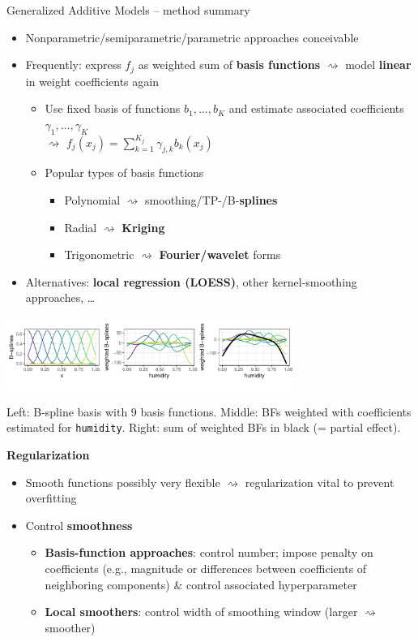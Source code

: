 \documentclass[11pt,compress,t,notes=noshow, xcolor=table]{beamer}
\newcommand{\highlight}[1]{\textcolor{hlcol}{\textbf{#1}}}
\begin{document}
\begin{vbframe}{Generalized Additive Models -- method summary}
\begin{itemize}
  \item Nonparametric/semiparametric/parametric approaches conceivable
  \item Frequently: express $f_j$ as weighted sum of \textbf{basis functions}
  $\rightsquigarrow$ model \textbf{linear} in weight coefficients again
  \begin{itemize}
      \item Use fixed basis of functions $b_1, \dots, b_K$ and estimate
      associated coefficients $\gamma_1, \dots, \gamma_K$ \\ $\rightsquigarrow$
      $f_j(x_j) = \textstyle \sum_{k=1}^{K_j} \gamma_{j, k} b_k(x_j)$
      \item Popular types of basis functions
      \begin{itemize}
        \footnotesize
        \item Polynomial $\rightsquigarrow$ smoothing/TP-/B-\textbf{splines}
        \item Radial $\rightsquigarrow$ \textbf{Kriging}
        \item Trigonometric $\rightsquigarrow$ \textbf{Fourier/wavelet} forms
      \end{itemize}
    \end{itemize}
    \item Alternatives: \textbf{local regression (LOESS)}, other
    kernel-smoothing approaches, \dots
\end{itemize}

\includegraphics[width=0.7\textwidth]{figure/gam_bike_spline_basis}

\tiny
Left: B-spline basis with 9 basis functions.
Middle: BFs weighted with coefficients estimated for
\texttt{humidity}.
Right: sum of weighted BFs in black (= partial effect).

\framebreak
\highlight{Regularization}
\begin{itemize}
    \item Smooth functions possibly very flexible $\rightsquigarrow$
    regularization vital to prevent overfitting
    \item Control \textbf{smoothness}
    \begin{itemize}
      \item \textbf{Basis-function approaches}: control number; impose penalty
      on coefficients
      (e.g., magnitude or differences between coefficients of neighboring
      components) \& control associated hyperparameter
      \item \textbf{Local smoothers}: control width of smoothing window
      (larger $\rightsquigarrow$ smoother)
    \end{itemize}
\end{itemize}


\end{vbframe}
\end{document}
